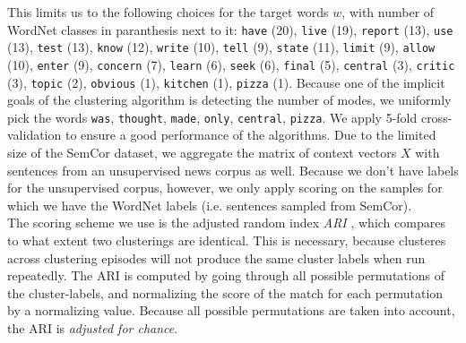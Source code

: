 \documentclass[a4paper,12pt,oneside,openright]{report}
\begin{document}
This limits us to the following choices for the target words $w$, with number of WordNet classes in paranthesis next to it: 
\Verb#have# (20), \Verb#live# (19), \Verb#report# (13), \Verb#use# (13), \Verb#test# (13), \Verb#know# (12), \Verb#write# (10), \Verb#tell# (9), \Verb#state# (11), \Verb#limit# (9), \Verb#allow# (10), \Verb#enter# (9), \Verb#concern# (7), \Verb#learn# (6), \Verb#seek# (6), \Verb#final# (5), \Verb#central# (3), \Verb#critic# (3), \Verb#topic# (2), \Verb#obvious# (1), \Verb#kitchen# (1), \Verb#pizza# (1).
Because one of the implicit goals of the clustering algorithm is detecting the number of modes, we uniformly pick the words \Verb#was#, \Verb#thought#, \Verb#made#, \Verb#only#, \Verb#central#, \Verb#pizza#.
We apply 5-fold cross-validation to ensure a good performance of the algorithms.
Due to the limited size of the SemCor dataset, we aggregate the matrix of context vectors $X$ with sentences from an unsupervised news corpus as well.
Because we don't have labels for the unsupervised corpus, however, we only apply scoring on the samples for which we have the WordNet labels (i.e. sentences sampled from SemCor). \\

The scoring scheme we use is the adjusted random index \textit{ARI} \cite{rand71}, \cite{hubert85} which compares to what extent two clusterings are identical.
This is necessary, because clusteres across clustering episodes will not produce the same cluster labels when run repeatedly.
The ARI is computed by going through all possible permutations of the cluster-labels, and normalizing the score of the match for each permutation by a normalizing value.
Because all possible permutations are taken into account, the ARI is \textit{adjusted for chance}.
\end{document}
